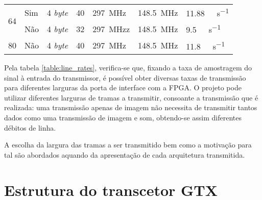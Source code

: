 \begin{table}[h!]
{\begin{tabular}{@{}lllllll@{}}
			\multirow{2}{*}{64}                                                        & Sim                                                                    & 4 \textit{byte}                                                                  & 40                                                                                 & \SI{297}{\mega\hertz}                & \SI{148.5}{\mega\hertz}              & \SI{11.88}{\giga\bit\per\second}                                                              \\
			& Não                                                                    & 4 \textit{byte}                                                                  & 32                                                                                 & \SI{297}{\mega\hertz}z                & \SI{148.5}{\mega\hertz}               & \SI{9.5}{\giga\bit\per\second}                                                                \\ \hline
			80                                                                         & Não                                                                    & 4 \textit{byte}                                                                  & 40                                                                                 & \SI{297}{\mega\hertz}                & \SI{148.5}{\mega\hertz}               & \SI{11.8}{\giga\bit\per\second}                                                              \\ \toprule
		\end{tabular}%
	}
\end{table}


Pela tabela \ref{table:line_rates}, verifica-se que, fixando a taxa de amostragem do sinal à entrada do transmissor, é possível obter diversas taxas de transmissão para diferentes larguras da porta de interface com a FPGA. O projeto pode utilizar diferentes larguras de tramas a transmitir, consoante a transmissão que é realizada: uma transmissão apenas de imagem não necessita de transmitir tantos dados como uma transmissão de imagem e som, obtendo-se assim diferentes débitos de linha.

A escolha da largura das tramas a ser transmitido bem como a motivação para tal são abordados aquando da apresentação de cada arquitetura transmitida.

\section{Estrutura do transcetor GTX}

